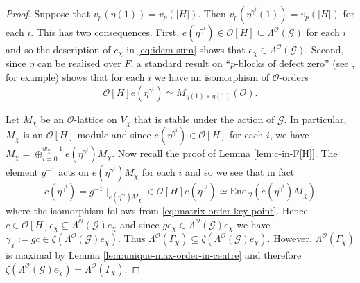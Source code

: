 \documentclass[12pt]{amsart}
\theoremstyle{plain}
\theoremstyle{remark}
\theoremstyle{definition}
\numberwithin{equation}{section}
\begin{document}
\begin{proof}
Suppose that $v_{p}(\eta(1))=v_{p}(|H|)$. Then $v_{p}(\eta^{\gamma^{i}}(1)) =v_{p}(|H|)$ for each $i$. This has two consequences.
First, $e(\eta^{\gamma^{i}}) \in \mathcal{O}[H] \subseteq \Lambda^{\mathcal{O}}(\mathcal{G})$ for each $i$
and so the description of $e_{\chi}$ in \eqref{eq:idem-sum} shows that $e_{\chi} \in \Lambda^{\mathcal{O}}(\mathcal{G})$.
Second, since $\eta$ can be realised over $F$,
a standard result on ``$p$-blocks of defect zero'' (see \cite[Proposition 46 (b)]{MR0450380}, for example) shows that for each $i$ we have
an isomorphism of $\mathcal{O}$-orders
\begin{equation}\label{eq:matrix-order-key-point}
\mathcal{O}[H]e(\eta^{\gamma^{i}}) \simeq M_{\eta(1) \times \eta(1)}(\mathcal{O}).
\end{equation}

Let $M_{\chi}$ be an $\mathcal{O}$-lattice on $V_{\chi}$ that is stable under the action of $\mathcal{G}$.
In particular, $M_{\chi}$ is an $\mathcal{O}[H]$-module and since $e(\eta^{\gamma^{i}}) \in \mathcal{O}[H]$ for each $i$,
we have $M_{\chi} = \oplus_{i=0}^{w_{\chi}-1}e(\eta^{\gamma^{i}})M_{\chi}$.
Now recall the proof of Lemma \ref{lem:c-in-F[H]}.
The element $g^{-1}$ acts on $e(\eta^{\gamma^{i}})M_{\chi}$ for each $i$ and so we see that in fact
\[
c(\eta^{\gamma^{i}}) =
g^{-1} \mid_{e(\eta^{\gamma^{i}})M_{\chi}} \in \mathcal{O}[H]e(\eta^{\gamma^{i}}) \simeq {\mathrm{End}}_{\mathcal{O}}(e(\eta^{\gamma^{i}})M_{\chi})
\]
where the isomorphism follows from \eqref{eq:matrix-order-key-point}.
Hence $c \in \mathcal{O}[H]e_{\chi} \subseteq \Lambda^{\mathcal{O}}(\mathcal{G})e_{\chi}$ and
since $ge_{\chi} \in  \Lambda^{\mathcal{O}}(\mathcal{G})e_{\chi}$ we have
$\gamma_{\chi} := gc\in \zeta(\Lambda^{\mathcal{O}}(\mathcal{G})e_{\chi})$.
Thus $\Lambda^{\mathcal{O}}(\Gamma_{\chi}) \subseteq \zeta(\Lambda^{\mathcal{O}}(\mathcal{G})e_{\chi})$.
However, $\Lambda^{\mathcal{O}}(\Gamma_{\chi})$ is maximal by Lemma \ref{lem:unique-max-order-in-centre}
and therefore $\zeta(\Lambda^{\mathcal{O}}(\mathcal{G})e_{\chi}) = \Lambda^{\mathcal{O}}(\Gamma_{\chi})$.


\end{proof}
\end{document}
